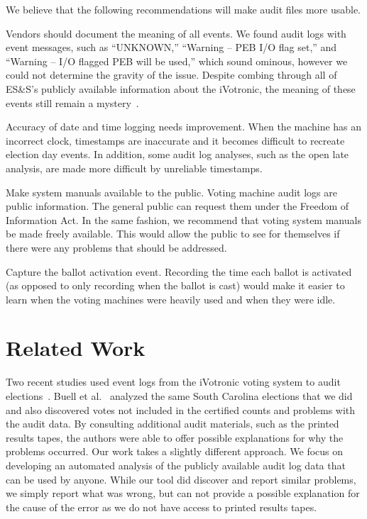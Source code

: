 \documentclass[letterpaper,twocolumn,10pt]{article}
\begin{document}
We believe that the following recommendations will make audit files more usable. 
 
Vendors should document the meaning of all events. We found audit logs with
event messages, such as ``UNKNOWN,'' ``Warning – PEB I/O flag set,'' and
``Warning – I/O flagged PEB will be used,'' which sound ominous, however we
could not determine the gravity of the issue. Despite combing through all of
ES\&S’s publicly available information about the iVotronic, the meaning of these
events still remain a mystery~\cite{VerVot2011, ESS2011a, ESS2011b}. 
 
Accuracy of date and time logging needs improvement. When the machine has an
incorrect clock, timestamps are inaccurate and it becomes difficult to recreate
election day events. In addition, some audit log analyses, such as the open late
analysis, are made more difficult by unreliable timestamps. 
 
Make system manuals available to the public. Voting machine audit logs are
public information. The general public can request them under the Freedom of
Information Act. In the same fashion, we recommend that voting system manuals be
made freely available. This would allow the public to see for themselves if
there were any problems that should be addressed.  
 
Capture the ballot activation event. Recording the time each ballot is activated
(as opposed to only recording when the ballot is cast) would make it easier to
learn when the voting machines were heavily used and when they were idle.  
 
 \section{Related Work}
Two recent studies used event logs from the iVotronic voting system to audit
elections~\cite{Buell2011, Sandler2007}. Buell et al.~\cite{Buell2011} analyzed
the same South Carolina elections that we did and also discovered votes not
included in the certified counts and problems with the audit data. By consulting
additional audit materials, such as the printed results tapes, the authors were
able to offer possible explanations for why the problems occurred. Our work
takes a slightly different approach. We focus on developing an automated
analysis of the publicly available audit log data that can be used by
anyone. While our tool did discover and report similar problems, we simply
report what was wrong, but can not provide a possible explanation for the cause
of the error as we do not have access to printed results tapes.  
\end{document}
